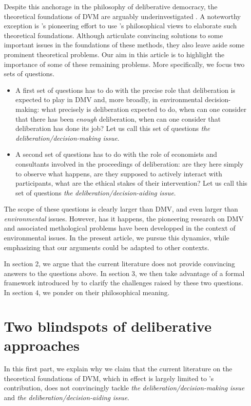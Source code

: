 \documentclass[version=3.21, pagesize, twoside=off, bibliography=totoc, DIV=calc, fontsize=12pt, a4paper, french, english]{scrartcl}
\begin{document}
Despite this anchorage in the philosophy of deliberative democracy, the theoretical foundations of DVM are arguably underinvestigated \citep{bartkowski_economic_2017,bartkowski_beyond_2018,bunse_what_2015,kenter_what_2015}. 
A noteworthy exception is \citet{bartkowski_beyond_2018}'s pioneering effort to use \citet{sen_idea_2009}'s philosophical views to elaborate such theoretical foundations. 
Although \citet{bartkowski_beyond_2018} articulate convincing solutions to some important issues in the foundations of these methods, they also leave aside some prominent theoretical problems. 
Our aim in this article is to highlight the importance of some of these remaining problems. 
More specifically, we focus two sets of questions.
\begin{itemize}
\item A first set of questions has to do with the precise role that deliberation is expected to play in DMV and, more broadly, in environmental decision-making: what precisely is deliberation expected to do, when can one consider that there has been \emph{enough} deliberation, when can one consider that deliberation has done its job?
Let us call this set of questions \emph{the deliberation/decision-making issue}.
\item A second set of questions has to do with the role of economists and consultants involved in the proceedings of deliberation: are they here simply to observe what happens, are they supposed to actively interact with participants, what are the ethical stakes of their intervention? 
Let us call this set of questions \emph{the deliberation/decision-aiding issue}.
\end{itemize}
The scope of these questions is clearly larger than DMV, and even larger than \emph{environmental} issues. 
However, has it happens, the pioneering research on DMV and associated methological problems have been developped in the context of environmental issues. 
In the present article, we pursue this dynamics, while emphasizing that our arguments could be adapted to other contexts.

In section 2, we argue that the current literature does not provide convincing answers to the questions above. 
In section 3, we then take advantage of a formal framework introduced by \citet{cailloux_formal_2018} to clarify the challenges raised by these two questions.
In section 4, we ponder on their philosophical meaning.

\section{Two blindspots of deliberative approaches}
In this first part, we explain why we claim that the current literature on the theoretical foundations of DVM, which in effect is largely limited to \citet{bartkowski_beyond_2018}'s contribution, does not convincingly tackle \emph{the deliberation/decision-making issue} and \emph{the deliberation/decision-aiding issue}.
\end{document}
